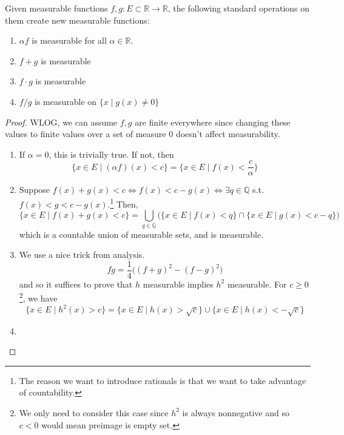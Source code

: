   \begin{theorem}
    Given measurable functions $f, g: E \subset \mathbb{R} \to \mathbb{R}$, the following standard operations on them create new measurable functions: 
    \begin{enumerate}
      \item $\alpha f$ is measurable for all $\alpha \in \mathbb{R}$. 
      \item $f + g$ is measurable 
      \item $f \cdot g$ is measurable 
      \item $f / g$ is measurable on $\{x \mid g(x) \neq 0\}$ 
    \end{enumerate}
  \end{theorem} 
  \begin{proof}
    WLOG, we can assume $f, g$ are finite everywhere since changing these values to finite values over a set of measure $0$ doesn't affect measurability. 
    \begin{enumerate}
      \item If $\alpha = 0$, this is trivially true. If not, then 
      \begin{equation}
        \{ x \in E \mid (\alpha f) (x) < c \} = \{x \in E \mid f(x) < \frac{c}{\alpha} \} 
      \end{equation}

      \item Suppose $f(x) + g(x) < c \iff f(x) < c - g(x) \iff \exists q \in \mathbb{Q}$ s.t. $f(x) < g < c - g(x)$.\footnote{The reason we want to introduce rationals is that we want to take advantage of countability.} Then, 
      \begin{equation}
        \{x \in E \mid f(x) + g(x) < c \} = \bigcup_{q \in \mathbb{Q}} \big( \{x \in E \mid f(x) < q\} \cap \{x \in E \mid g(x) < c - q \}\big)
      \end{equation}
      which is a countable union of measurable sets, and is measurable. 

      \item We use a nice trick from analysis. 
      \begin{equation}
        fg = \frac{1}{4} \big( (f + g)^2 - (f - g)^2 \big) 
      \end{equation}
      and so it suffices to prove that $h$ measurable implies $h^2$ measurable. For $c \geq 0$\footnote{We only need to consider this case since $h^2$ is always nonnegative and so $c < 0$ would mean preimage is empty set.}, we have 
      \begin{equation}
        \{ x \in E \mid h^2 (x) > c \} = \{x \in E \mid h(x) > \sqrt{c} \} \cup \{x \in E \mid h(x) < -\sqrt{c} \}
      \end{equation}

      \item 
    \end{enumerate}
  \end{proof}

